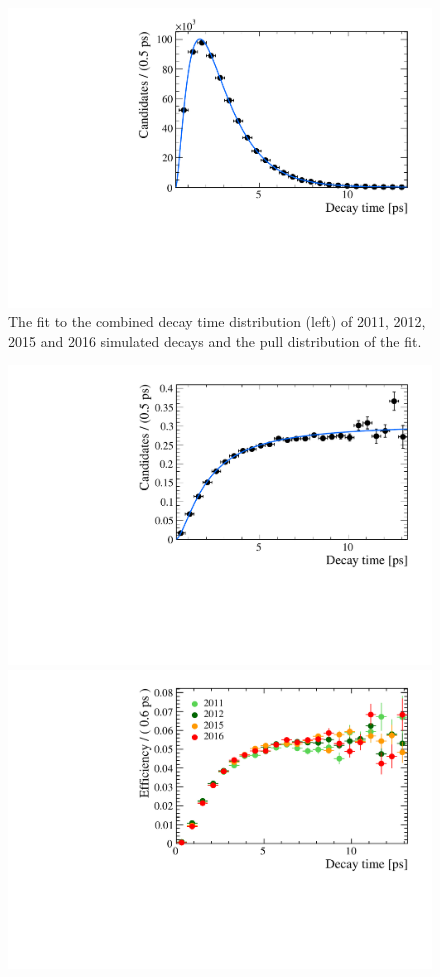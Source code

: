 {\begin{figure}[htbp]
    \centering
        \includegraphics[width= 0.49 \textwidth]{./Figs/LifetimeMeasurement/Bs2MuMu_Acceptance_fit.pdf}
    \caption{The \ml fit to the combined decay time distribution (left) of 2011, 2012, 2015 and 2016 simulated \bsmumu decays and the pull distribution of the fit. }
    \label{fig:accptfit}
\end{figure}


\begin{figure}[htbp]
    \centering
        \includegraphics[width= 0.7 \textwidth]{./Figs/LifetimeMeasurement/Bs2MuMu_Acceptance_plot.pdf}
        \includegraphics[width= 0.7 \textwidth]{./Figs/LifetimeMeasurement/Acceptance_per_year.pdf}


\end{figure}}
